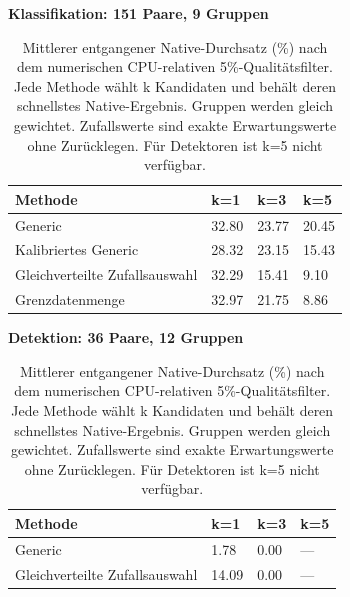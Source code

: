 \begin{table}[t]
\centering
\caption{Mittlerer entgangener Native-Durchsatz (\%) nach dem numerischen CPU-relativen 5\%-Qualitätsfilter. Jede Methode wählt k Kandidaten und behält deren schnellstes Native-Ergebnis. Gruppen werden gleich gewichtet. Zufallswerte sind exakte Erwartungswerte ohne Zurücklegen. Für Detektoren ist k=5 nicht verfügbar.}
\label{tab:budget}
\begingroup\small\setlength{\tabcolsep}{3pt}
\par\smallskip\textbf{Klassifikation: 151 Paare, 9 Gruppen}\par\smallskip
\begin{tabular}{llll}
\toprule
Methode & k=1 & k=3 & k=5 \\
\midrule
Generic & 32.80 & 23.77 & 20.45 \\
Kalibriertes Generic & 28.32 & 23.15 & 15.43 \\
Gleichverteilte Zufallsauswahl & 32.29 & 15.41 & 9.10 \\
Grenzdatenmenge & 32.97 & 21.75 & 8.86 \\
\bottomrule
\end{tabular}
\par\smallskip\textbf{Detektion: 36 Paare, 12 Gruppen}\par\smallskip
\begin{tabular}{llll}
\toprule
Methode & k=1 & k=3 & k=5 \\
\midrule
Generic & 1.78 & 0.00 & --- \\
Gleichverteilte Zufallsauswahl & 14.09 & 0.00 & --- \\
\bottomrule
\end{tabular}
\endgroup
\end{table}
